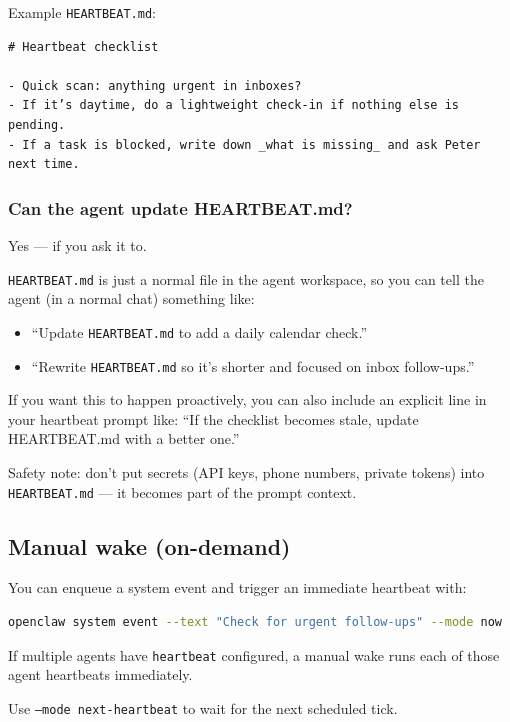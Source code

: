Example \texttt{HEARTBEAT.md}:

\begin{lstlisting}
# Heartbeat checklist

- Quick scan: anything urgent in inboxes?
- If it’s daytime, do a lightweight check-in if nothing else is pending.
- If a task is blocked, write down _what is missing_ and ask Peter next time.
\end{lstlisting}


\subsubsection{Can the agent update HEARTBEAT.md?}


Yes — if you ask it to.

\texttt{HEARTBEAT.md} is just a normal file in the agent workspace, so you can tell the
agent (in a normal chat) something like:

\begin{itemize}
  \item “Update \texttt{HEARTBEAT.md} to add a daily calendar check.”
  \item “Rewrite \texttt{HEARTBEAT.md} so it’s shorter and focused on inbox follow-ups.”
\end{itemize}


If you want this to happen proactively, you can also include an explicit line in
your heartbeat prompt like: “If the checklist becomes stale, update HEARTBEAT.md
with a better one.”

Safety note: don’t put secrets (API keys, phone numbers, private tokens) into
\texttt{HEARTBEAT.md} — it becomes part of the prompt context.

\subsection{Manual wake (on-demand)}


You can enqueue a system event and trigger an immediate heartbeat with:

\begin{lstlisting}[language=bash]
openclaw system event --text "Check for urgent follow-ups" --mode now
\end{lstlisting}


If multiple agents have \texttt{heartbeat} configured, a manual wake runs each of those
agent heartbeats immediately.

Use \texttt{--mode next-heartbeat} to wait for the next scheduled tick.

